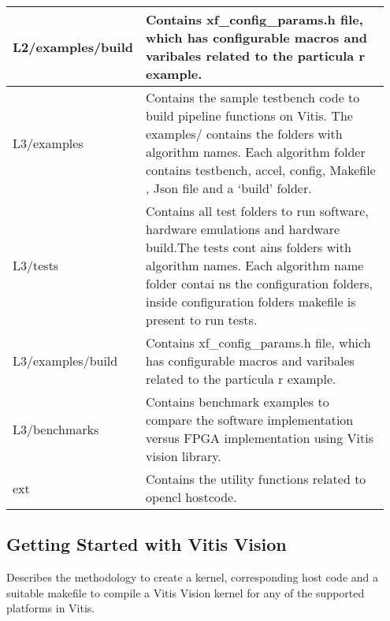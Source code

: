 \begin{table}[H]
{\begin{tabular}{|>{\hspace{0pt}}m{0.20\linewidth}|>{\hspace{0pt}}m{0.75\linewidth}|}
  \hline
  L2/examples/build   & Contains xf\_config\_params.h file, which has configurable macros and varibales related to the particula r example.                                                                                                                                                                          \\ 
  \hline
  L3/examples         & Contains the sample testbench code to build pipeline functions on Vitis. The examples/ contains the folders with algorithm names. Each algorithm folder contains testbench, accel, config, Makefile , Json file and a ‘build’ folder.                                                        \\ 
  \hline
  L3/tests            & Contains all test folders to run software, hardware emulations and hardware build.The tests cont ains folders with algorithm names. Each algorithm name folder contai ns the configuration folders, inside configuration folders makefile is present to run tests.                           \\ 
  \hline
  L3/examples/build   & Contains xf\_config\_params.h file, which has configurable macros and varibales related to the particula r example.                                                                                                                                                                          \\ 
  \hline
  L3/benchmarks       & Contains benchmark examples to compare the software implementation versus FPGA implementation using Vitis vision library.                                                                                                                                                                    \\ 
  \hline
  ext                 & Contains the utility functions related to opencl hostcode.                                                                                                                                                                                                                                   \\
  \hline
  \end{tabular}
  }
\end{table}

\clearpage

\subsection{Getting Started with Vitis Vision}
Describes the methodology to create a kernel, corresponding host code and a suitable makefile to compile a Vitis Vision kernel for any of the supported platforms in Vitis.

